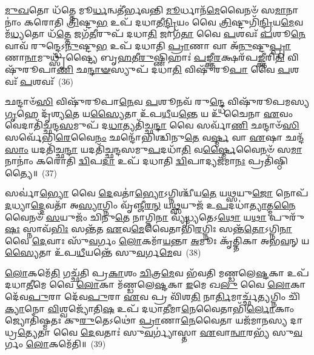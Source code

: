 \-\ul{𑌮𑍁}\-\-\ul{𑌖}\-𑌤𑍋 𑌧᳴𑌤𑍍𑌤𑍇 𑌮𑍂\-\ul{𑌰𑍍𑌧}\-𑌨𑍍𑌵𑌤𑍀॑𑌰𑍍𑌭𑌵𑌨𑍍𑌤𑌿 \ul{𑌮𑍂}\-𑌰𑍍𑌧𑌾𑌨᳴\-\ul{𑌮𑍇}\-𑌵𑍈𑌨𑍞᳴ 𑌸\-\ul{𑌮𑌾}\-𑌨𑌾𑌨𑌾𑌂॑ 𑌕𑌰𑍋𑌤𑌿 \ul{𑌤𑍍𑌰𑌿}\-𑌷𑍍𑌟𑍁\-\ul{𑌭} 𑌉𑌪᳴ 𑌦𑌧𑌾𑌤𑍀\-\ul{𑌨𑍍𑌦𑍍𑌰𑌿}\-𑌯𑌂 𑌵𑍈 \ul{𑌤𑍍𑌰𑌿}\-𑌷𑍍𑌟𑍁𑌗𑌿᳴\-\ul{𑌨𑍍𑌦𑍍𑌰𑌿}\-𑌯\-\ul{𑌮𑍇}\-𑌵 𑌮᳴\-\ul{𑌧𑍍𑌯}\-𑌤𑍋 𑌧᳴\-\ul{𑌤𑍍𑌤𑍇} 𑌜𑌗᳴\-\ul{𑌤𑍀}\-𑌰𑍁𑌪᳴ 𑌦𑌧𑌾\-\ul{𑌤𑌿} 𑌜𑌾𑌗᳴\-\ul{𑌤𑌾} 𑌵𑍈 \ul{𑌪}\-𑌶𑌵𑌃᳴ \ul{𑌪}\-𑌶𑍂\-\ul{𑌨𑍇}\-𑌵𑌾𑌵᳴ 𑌰𑍁𑌨𑍍𑌦𑍍𑌧𑍇\-𑌽\-\ul{𑌨𑍁}\-𑌷𑍍𑌟𑍁\-\ul{𑌭} 𑌉𑌪᳴ 𑌦𑌧𑌾𑌤𑌿 \ul{𑌪𑍍𑌰𑌾}\-𑌣𑌾 𑌵𑌾 𑌅᳴\-\ul{𑌨𑍁}\-𑌷𑍍𑌟𑍁\-\ul{𑌪𑍍𑌪𑍍𑌰𑌾}\-𑌣𑌾\-\ul{𑌨𑌾}\-𑌮𑍁𑌥𑍍𑌸𑍃᳴𑌷𑍍𑌟𑍍𑌯𑍈 𑌬𑍃\-\ul{𑌹}\-𑌤𑍀\-\ul{𑌰𑍁}\-𑌷𑍍𑌣𑌿𑌹𑌾𑌃॑ \ul{𑌪}\-𑌙𑍍𑌕𑍍𑌤𑍀\-\ul{𑌰}\-𑌕𑍍𑌷𑌰᳴𑌪\-\ul{𑌙𑍍𑌕𑍍𑌤𑍀}\-𑌰𑌿\-\ul{𑌤𑌿} 𑌵𑌿𑌷𑍁᳴𑌰𑍂𑌪𑌾\-\ul{𑌣𑌿} 𑌛\-\ul{𑌨𑍍𑌦𑌾}\-\-\ul{𑍟}\-𑌸𑍍𑌯𑍁𑌪᳴ 𑌦𑌧𑌾\-\ul{𑌤𑌿} 𑌵𑌿𑌷𑍁᳴𑌰𑍂\-\ul{𑌪𑌾} 𑌵𑍈 \ul{𑌪}\-𑌶𑌵𑌃᳴ \ul{𑌪}\-𑌶𑌵𑌃᳴~(36)

𑌛𑌨𑍍𑌦𑌾𑍞᳴\-\ul{𑌸𑌿} 𑌵𑌿𑌷𑍁᳴𑌰𑍂𑌪𑌾\-\ul{𑌨𑍇}\-𑌵 \ul{𑌪}\-𑌶𑍂𑌨𑌵᳴ 𑌰𑍁\-\ul{𑌨𑍍𑌦𑍍𑌧𑍇} 𑌵𑌿𑌷𑍁᳴𑌰𑍂𑌪𑌮𑌸𑍍𑌯 \ul{𑌗𑍃}\-𑌹𑍇 𑌦𑍃᳴𑌶𑍍𑌯\-\ul{𑌤𑍇} 𑌯\-\ul{𑌸𑍍𑌯𑍈}\-𑌤𑌾 𑌉᳴𑌪\-\ul{𑌧𑍀}\-𑌯\-\ul{𑌨𑍍𑌤𑍇} 𑌯 𑌉᳴ 𑌚𑍈𑌨𑌾 \ul{𑌏}\-𑌵𑌂 𑌵𑍇𑌦𑌾𑌤𑌿᳴𑌚𑍍𑌛𑌨𑍍𑌦\-\ul{𑌸}\-𑌮𑍁𑌪᳴ 𑌦\-\ul{𑌧𑌾}\-𑌤𑍍𑌯𑌤𑌿᳴𑌚𑍍𑌛\-\ul{𑌨𑍍𑌦𑌾} 𑌵𑍈 𑌸𑌰𑍍𑌵𑌾᳴\-\ul{𑌣𑌿} 𑌛𑌨𑍍𑌦𑌾𑍞᳴\-\ul{𑌸𑌿} 𑌸𑌰𑍍𑌵𑍇᳴𑌭𑌿\-\ul{𑌰𑍇}\-𑌵𑍈\-\ul{𑌨𑌂} 𑌛𑌨𑍍𑌦𑍋᳴𑌭𑌿𑌶𑍍𑌚𑌿𑌨𑍁\-\ul{𑌤𑍇} 𑌵\-\ul{𑌰𑍍𑌷𑍍𑌮} 𑌵𑌾 \ul{𑌏}\-𑌷𑌾 𑌛𑌨𑍍𑌦᳴\-\ul{𑌸𑌾𑌂} 𑌯𑌦𑌤𑌿᳴𑌚𑍍𑌛\-\ul{𑌨𑍍𑌦𑌾} 𑌯𑌦𑌤𑌿᳴𑌚𑍍𑌛𑌨𑍍𑌦𑌸𑌮𑍁\-\ul{𑌪}\-𑌦𑌧𑌾᳴\-\ul{𑌤𑌿} 𑌵\-\ul{𑌰𑍍𑌷𑍍𑌮𑍈}\-𑌵𑍈𑌨𑍞᳴ 𑌸\-\ul{𑌮𑌾}\-𑌨𑌾𑌨𑌾𑌂॑ 𑌕𑌰𑍋𑌤𑌿 \ul{𑌦𑍍𑌵𑌿}\-𑌪\-\ul{𑌦𑌾} 𑌉𑌪᳴ 𑌦𑌧𑌾𑌤𑌿 \ul{𑌦𑍍𑌵𑌿}\-𑌪𑌾𑌦𑍍𑌯𑌜᳴𑌮𑌾\-\ul{𑌨𑌃} 𑌪𑍍𑌰𑌤𑌿᳴𑌷𑍍𑌠𑌿𑌤𑍍𑌯𑍈॥~(37)

{\anuvakamend[{𑌤𑍇𑌜᳴ \ul{𑌏}\-𑌵 \ul{𑌪}\-𑌶𑌵𑌃᳴ \ul{𑌪}\-𑌶\-\ul{𑌵𑍋} 𑌯𑌜᳴𑌮𑌾\-\ul{𑌨} 𑌏𑌕᳴𑌞𑍍𑌚}]}%

𑌸𑌰𑍍𑌵𑌾॑\-\ul{𑌭𑍍𑌯𑍋} 𑌵𑍈 \ul{𑌦𑍇}\-𑌵𑌤𑌾॑\-\ul{𑌭𑍍𑌯𑍋}\-\-𑌽𑌗𑍍𑌨𑌿𑌶𑍍𑌚𑍀᳴𑌯\-\ul{𑌤𑍇} 𑌯\-\ul{𑌥𑍍𑌸}\-𑌯𑍁\-\ul{𑌜𑍋} 𑌨𑍋𑌪᳴\-\ul{𑌦}\-𑌧𑍍𑌯𑌾\-\ul{𑌦𑍍𑌦𑍇}\-𑌵𑌤𑌾᳴ 𑌅\-\ul{𑌸𑍍𑌯𑌾}\-𑌗𑍍𑌨𑌿𑌂 𑌵𑍃᳴𑌞𑍍𑌜𑍀\-\ul{𑌰}\-\-\ul{𑌨𑍍} 𑌯\-\ul{𑌥𑍍𑌸}\-𑌯𑍁𑌜᳴ 𑌉\-\ul{𑌪}\-𑌦𑌧𑌾॑\-\ul{𑌤𑍍𑌯𑌾}\-𑌤𑍍𑌮\-\ul{𑌨𑍈}\-𑌵𑍈𑌨𑍞᳴ \ul{𑌸}\-𑌯𑍁𑌜𑌂᳴ 𑌚𑌿𑌨𑍁\-\ul{𑌤𑍇} 𑌨𑌾𑌗𑍍𑌨𑌿\-\ul{𑌨𑌾} 𑌵𑍍𑌯𑍃᳴\-\ul{𑌧𑍍𑌯}\-𑌤𑍇\-𑌽\-\ul{𑌥𑍋} 𑌯\-\ul{𑌥𑌾} 𑌪𑍁𑌰𑍁᳴\-\ul{𑌷𑌃} 𑌸𑍍𑌨𑌾𑌵᳴\-\ul{𑌭𑌿𑌃} 𑌸𑌨𑍍𑌤᳴𑌤 \ul{𑌏}\-𑌵\-\ul{𑌮𑍇}\-𑌵𑍈𑌤𑌾𑌭𑌿᳴\-\ul{𑌰}\-𑌗𑍍𑌨𑌿𑌃 𑌸𑌨𑍍𑌤᳴\-\ul{𑌤𑍋}\-\-𑌽𑌗𑍍𑌨𑌿\-\ul{𑌨𑌾} 𑌵𑍈 \ul{𑌦𑍇}\-𑌵𑌾𑌃 𑌸𑍁᳴\-\ul{𑌵}\-𑌰𑍍𑌗𑌂 \ul{𑌲𑍋}\-𑌕𑌮𑌾᳴\-\ul{𑌯}\-𑌨𑍍𑌤𑌾 \ul{𑌅}\-𑌮𑍂𑌃 𑌕𑍃᳴𑌤𑍍𑌤𑌿𑌕𑌾 𑌅𑌭\-\ul{𑌵}\-𑌨𑍍 𑌯\-\ul{𑌸𑍍𑌯𑍈}\-𑌤𑌾 𑌉᳴𑌪\-\ul{𑌧𑍀}\-𑌯𑌨𑍍𑌤𑍇᳴ 𑌸𑍁\-\ul{𑌵}\-𑌰𑍍𑌗\-\ul{𑌮𑍇}\-𑌵~(38)

\-\ul{𑌲𑍋}\-𑌕𑌮𑍇᳴\-\ul{𑌤𑌿} 𑌗𑌚𑍍𑌛᳴𑌤𑌿 𑌪𑍍𑌰\-\ul{𑌕𑌾}\-𑌶𑌂 \ul{𑌚𑌿}\-𑌤𑍍𑌰\-\ul{𑌮𑍇}\-𑌵 𑌭᳴𑌵𑌤𑌿 𑌮𑌣𑍍𑌡𑌲𑍇\-\ul{𑌷𑍍𑌟}\-𑌕𑌾 𑌉𑌪᳴ 𑌦𑌧𑌾\-\ul{𑌤𑍀}\-𑌮𑍇 𑌵𑍈 \ul{𑌲𑍋}\-𑌕𑌾 𑌮᳴𑌣𑍍𑌡𑌲𑍇\-\ul{𑌷𑍍𑌟}\-𑌕𑌾 \ul{𑌇}\-𑌮𑍇 𑌖\-\ul{𑌲𑍁} 𑌵𑍈 \ul{𑌲𑍋}\-𑌕𑌾 𑌦𑍇᳴𑌵\-\ul{𑌪𑍁}\-𑌰𑌾 𑌦𑍇᳴𑌵\-\ul{𑌪𑍁}\-𑌰𑌾 \ul{𑌏}\-𑌵 𑌪𑍍𑌰 𑌵𑌿᳴𑌶\-\ul{𑌤𑌿} 𑌨𑌾\-\ul{𑌰𑍍𑌤𑌿}\-𑌮𑌾𑌰𑍍𑌚𑍍𑌛᳴\-\ul{𑌤𑍍𑌯}\-𑌗𑍍𑌨𑌿𑌂 𑌚𑌿᳴\-\ul{𑌕𑍍𑌯𑌾}\-𑌨𑍋 \ul{𑌵𑌿}\-𑌶𑍍𑌵𑌜𑍍𑌯𑍋᳴𑌤𑌿\-\ul{𑌷} 𑌉𑌪᳴ 𑌦𑌧𑌾\-\ul{𑌤𑍀}\-𑌮𑌾\-\ul{𑌨𑍇}\-𑌵𑍈𑌤𑌾𑌭𑌿᳴\-\ul{𑌰𑍍𑌲𑍋}\-𑌕𑌾𑌂 𑌜𑍍𑌯𑍋𑌤𑌿᳴𑌷𑍍𑌮𑌤𑌃 𑌕𑍁\-\ul{𑌰𑍁}\-𑌤𑍇\-𑌽𑌥𑍋॑ \ul{𑌪𑍍𑌰𑌾}\-𑌣𑌾\-\ul{𑌨𑍇}\-𑌵𑍈𑌤𑌾 𑌯𑌜᳴𑌮𑌾𑌨𑌸𑍍𑌯 𑌦𑌾𑌧𑍍𑌰\-\ul{𑌤𑍍𑌯𑍇}\-𑌤𑌾 𑌵𑍈 \ul{𑌦𑍇}\-𑌵𑌤𑌾𑌃॑ 𑌸𑍁\-\ul{𑌵}\-𑌰𑍍𑌗𑍍𑌯𑌾॑𑌸𑍍𑌤𑌾 \ul{𑌏}\-𑌵𑌾\-\ul{𑌨𑍍𑌵𑌾}\-𑌰𑌭𑍍𑌯᳴ 𑌸𑍁\-\ul{𑌵}\-𑌰𑍍𑌗𑌂 \ul{𑌲𑍋}\-𑌕𑌮𑍇᳴𑌤𑌿॥~(39)

